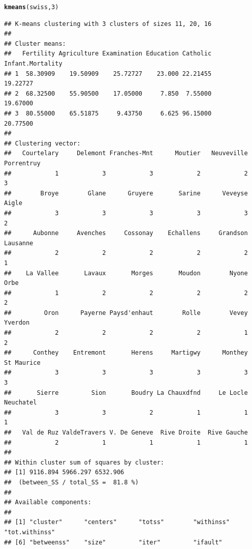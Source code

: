 \documentclass[11pt, a4paper]{article}\usepackage[]{graphicx}\usepackage[]{xcolor}
\makeatletter
\newcommand{\hlnum}[1]{\textcolor[rgb]{0.686,0.059,0.569}{#1}}%
\newcommand{\hldef}[1]{\textcolor[rgb]{0.345,0.345,0.345}{#1}}%
\newcommand{\hlkwd}[1]{\textcolor[rgb]{0.737,0.353,0.396}{\textbf{#1}}}%
\newenvironment{kframe}{%
 \def\at@end@of@kframe{}%
 \ifinner\ifhmode%
  \def\at@end@of@kframe{\end{minipage}}%
  \begin{minipage}{\columnwidth}%
 \fi\fi%
 \def\FrameCommand##1{\hskip\@totalleftmargin \hskip-\fboxsep
 \colorbox{shadecolor}{##1}\hskip-\fboxsep
     \hskip-\linewidth \hskip-\@totalleftmargin \hskip\columnwidth}%
 \MakeFramed {\advance\hsize-\width
   \@totalleftmargin\z@ \linewidth\hsize
   \@setminipage}}%
 {\par\unskip\endMakeFramed%
 \at@end@of@kframe}
\newenvironment{knitrout}{}{} %
\makeatother
\begin{document}
\begin{knitrout}
\color{fgcolor}\begin{kframe}
\begin{alltt}
\hlkwd{kmeans}\hldef{(swiss,} \hlnum{3}\hldef{)}
\end{alltt}
\begin{verbatim}
## K-means clustering with 3 clusters of sizes 11, 20, 16
## 
## Cluster means:
##   Fertility Agriculture Examination Education Catholic Infant.Mortality
## 1  58.30909    19.50909    25.72727    23.000 22.21455         19.22727
## 2  68.32500    55.90500    17.05000     7.850  7.55000         19.67000
## 3  80.55000    65.51875     9.43750     6.625 96.15000         20.77500
## 
## Clustering vector:
##   Courtelary     Delemont Franches-Mnt      Moutier   Neuveville   Porrentruy 
##            1            3            3            2            2            3 
##        Broye        Glane      Gruyere       Sarine      Veveyse        Aigle 
##            3            3            3            3            3            2 
##      Aubonne     Avenches     Cossonay    Echallens     Grandson     Lausanne 
##            2            2            2            2            2            1 
##    La Vallee       Lavaux       Morges       Moudon        Nyone         Orbe 
##            1            2            2            2            2            2 
##         Oron      Payerne Paysd'enhaut        Rolle        Vevey      Yverdon 
##            2            2            2            2            1            2 
##      Conthey    Entremont       Herens     Martigwy      Monthey   St Maurice 
##            3            3            3            3            3            3 
##       Sierre         Sion       Boudry La Chauxdfnd     Le Locle    Neuchatel 
##            3            3            2            1            1            1 
##   Val de Ruz ValdeTravers V. De Geneve  Rive Droite  Rive Gauche 
##            2            1            1            1            1 
## 
## Within cluster sum of squares by cluster:
## [1] 9116.894 5966.297 6532.906
##  (between_SS / total_SS =  81.8 %)
## 
## Available components:
## 
## [1] "cluster"      "centers"      "totss"        "withinss"     "tot.withinss"
## [6] "betweenss"    "size"         "iter"         "ifault"
\end{verbatim}
\end{kframe}
\end{knitrout}

\newpage
\end{document}
